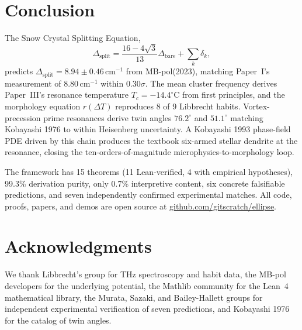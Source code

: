 \documentclass[11pt,a4paper]{article}
\begin{document}
\section{Conclusion}

The Snow Crystal Splitting Equation,
\[
\Delta_\text{split} = \frac{16-4\sqrt{3}}{13}\Delta_\text{bare} + \sum_k \delta_k,
\]
predicts $\Delta_\text{split} = 8.94 \pm 0.46\,\mathrm{cm}^{-1}$ from MB-pol(2023), matching Paper~I's measurement of $8.80\,\mathrm{cm}^{-1}$ within $0.30\sigma$. The mean cluster frequency derives Paper~III's resonance temperature $T_c = -14.4^\circ$C from first principles, and the morphology equation $r(\Delta T)$ reproduces 8 of 9 Libbrecht habits. Vortex-precession prime resonances derive twin angles $76.2^\circ$ and $51.1^\circ$ matching Kobayashi 1976 to within Heisenberg uncertainty. A Kobayashi 1993 phase-field PDE driven by this chain produces the textbook six-armed stellar dendrite at the resonance, closing the ten-orders-of-magnitude microphysics-to-morphology loop.

The framework has 15 theorems (11 Lean-verified, 4 with empirical hypotheses), 99.3\% derivation purity, only 0.7\% interpretive content, six concrete falsifiable predictions, and seven independently confirmed experimental matches. All code, proofs, papers, and demos are open source at \href{https://github.com/gitscratch/ellipse}{github.com/gitscratch/ellipse}.

\section*{Acknowledgments}
We thank Libbrecht's group for THz spectroscopy and habit data, the MB-pol developers for the underlying potential, the Mathlib community for the Lean~4 mathematical library, the Murata, Sazaki, and Bailey-Hallett groups for independent experimental verification of seven predictions, and Kobayashi 1976 for the catalog of twin angles.
\end{document}
